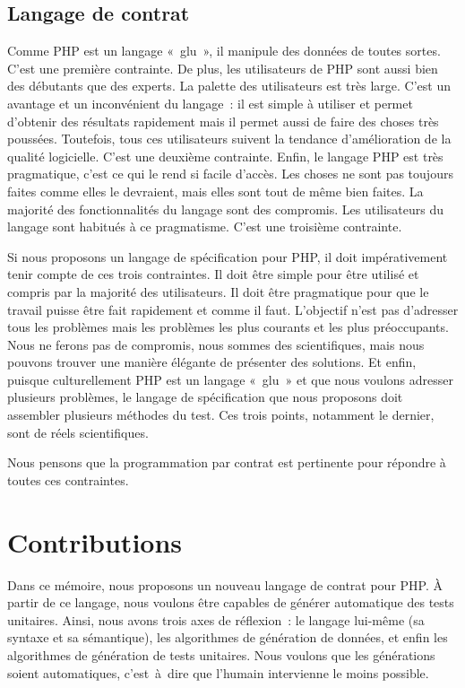 \subsection{Langage de contrat}

Comme PHP est un langage «~glu~», il manipule des données de toutes sortes.
C'est une première contrainte. De plus, les utilisateurs de PHP sont aussi bien
des débutants que des experts. La palette des utilisateurs est très large. C'est
un avantage et un inconvénient du langage~: il est simple à utiliser et permet
d'obtenir des résultats rapidement mais il permet aussi de faire des choses très
poussées. Toutefois, tous ces utilisateurs suivent la tendance d'amélioration de
la qualité logicielle. C'est une deuxième contrainte. Enfin, le langage PHP est
très pragmatique, c'est ce qui le rend si facile d'accès. Les choses ne sont pas
toujours faites comme elles le devraient, mais elles sont tout de même bien
faites. La majorité des fonctionnalités du langage sont des compromis. Les
utilisateurs du langage sont habitués à ce pragmatisme. C'est une troisième
contrainte.

Si nous proposons un langage de spécification pour PHP, il doit impérativement
tenir compte de ces trois contraintes. Il doit être simple pour être utilisé et
compris par la majorité des utilisateurs. Il doit être pragmatique pour que le
travail puisse être fait rapidement et comme il faut. L'objectif n'est pas
d'adresser tous les problèmes mais les problèmes les plus courants et les plus
préoccupants. Nous ne ferons pas de compromis, nous sommes des scientifiques,
mais nous pouvons trouver une manière élégante de présenter des solutions. Et
enfin, puisque culturellement PHP est un langage «~glu~» et que nous voulons
adresser plusieurs problèmes, le langage de spécification que nous proposons
doit assembler plusieurs méthodes du test. Ces trois points, notamment le
dernier, sont de réels  scientifiques.

Nous pensons que la programmation par contrat est pertinente pour répondre à
toutes ces contraintes.

\section{Contributions}
\label{section:introduction:contributions}

Dans ce mémoire, nous proposons un nouveau langage de contrat pour PHP. À partir
de ce langage, nous voulons être capables de générer automatique des tests
unitaires. Ainsi, nous avons trois axes de réflexion~: le langage lui-même (sa
syntaxe et sa sémantique), les algorithmes de génération de données, et enfin
les algorithmes de génération de tests unitaires. Nous voulons que les
générations soient automatiques, c'est~à~dire que l'humain intervienne le moins
possible.

